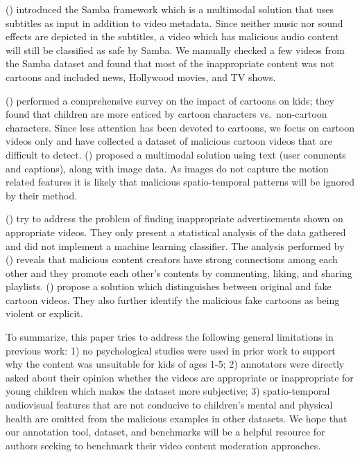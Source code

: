 \documentclass[letterpaper]{article}
\begin{document}
\citeauthor{5} (\citeyear{5}) introduced the Samba framework which is a multimodal solution that uses subtitles as input in addition to video metadata. Since neither music nor sound effects are depicted in the subtitles, a video which has malicious audio content  will still be classified as safe by Samba. We manually checked a few videos from the Samba dataset and found that most of the inappropriate content was not cartoons and included news, Hollywood movies, and TV shows.


\citeauthor{cartoonsurvey} (\citeyear{cartoonsurvey}) performed a comprehensive survey on the impact of cartoons on kids; they found that children are more enticed by cartoon characters vs.\ non-cartoon characters. Since less attention has been devoted to cartoons, we focus on cartoon videos only and have collected a  dataset of malicious cartoon videos that are difficult to detect.
\citeauthor{2} (\citeyear{2}) proposed a multimodal solution using text (user comments and captions), along with image data.  As images do not capture the motion related features it is likely that malicious spatio-temporal patterns will be ignored by their method. 

\citeauthor{4} (\citeyear{4}) try to address the problem of finding inappropriate advertisements shown on appropriate videos. They only present a statistical analysis of the data gathered and did not implement a machine learning classifier.
The analysis performed by \citeauthor{10} (\citeyear{10}) reveals that malicious content creators have strong connections among each other and they promote each other's contents by commenting, liking, and sharing playlists.
\citeauthor{8} (\citeyear{8}) propose a solution which distinguishes between original and fake cartoon videos.  They also further identify the malicious fake cartoons as being violent or explicit. 

To summarize, this paper tries to address the following general limitations in previous work:
 1) no psychological studies were used in prior work to support why the content was unsuitable for kids of ages 1-5; 2) annotators were directly asked about their opinion whether the videos are appropriate or inappropriate for young children which makes the dataset more subjective; 3) spatio-temporal audiovisual features that are not conducive to children's mental and physical health are omitted from the malicious examples in other datasets.  We hope that our annotation tool, dataset, and benchmarks will be a helpful resource for authors seeking to benchmark their video content moderation approaches.
 
\end{document}
